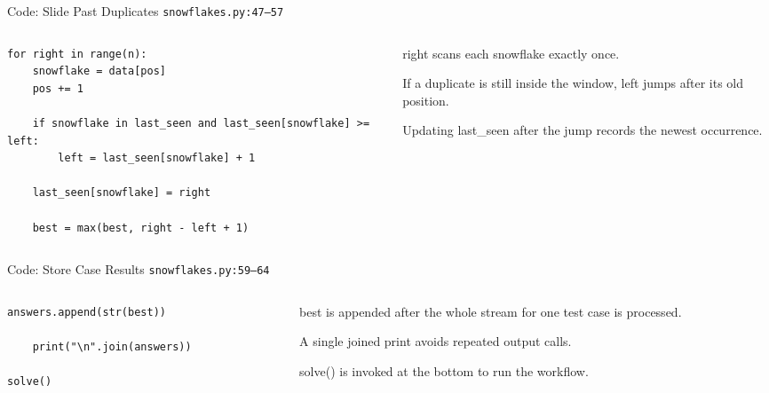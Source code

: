\documentclass[aspectratio=169,11pt]{beamer}
\begin{document}
\begin{frame}[fragile]{Code: Slide Past Duplicates}
\scriptsize
{} \texttt{snowflakes.py:47--57}

\vspace{0.08cm}
\begin{columns}[T,totalwidth=\textwidth]
\begin{column}{0.58\textwidth}
\begin{lstlisting}[style=cpcode]
for right in range(n):
    snowflake = data[pos]
    pos += 1

    if snowflake in last_seen and last_seen[snowflake] >= left:
        left = last_seen[snowflake] + 1

    last_seen[snowflake] = right

    best = max(best, right - left + 1)
\end{lstlisting}
\end{column}
\begin{column}{0.38\textwidth}
\begin{tightitemize}
  \item right scans each snowflake exactly once.
  \item If a duplicate is still inside the window, left jumps after its old position.
  \item Updating last\_seen after the jump records the newest occurrence.
\end{tightitemize}
\end{column}
\end{columns}
\end{frame}

\begin{frame}[fragile]{Code: Store Case Results}
\scriptsize
{} \texttt{snowflakes.py:59--64}

\vspace{0.08cm}
\begin{columns}[T,totalwidth=\textwidth]
\begin{column}{0.58\textwidth}
\begin{lstlisting}[style=cpcode]
        answers.append(str(best))

    print("\n".join(answers))

solve()
\end{lstlisting}
\end{column}
\begin{column}{0.38\textwidth}
\begin{tightitemize}
  \item best is appended after the whole stream for one test case is processed.
  \item A single joined print avoids repeated output calls.
  \item solve() is invoked at the bottom to run the workflow.
\end{tightitemize}
\end{column}
\end{columns}
\end{frame}
\end{document}
